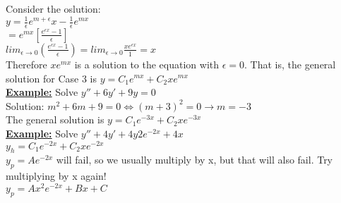 \documentclass[12pt]{article}
\newcommand{\myt}[1]{\textbf{\underline{#1}}}
\begin{document}
	Consider the oslution:\\
	$y = \frac{1}{\epsilon}e^{m+\epsilon}x - \frac{1}{\epsilon}e^{mx}$\\
	$= e^{mx}[\frac{e^{\epsilon x} - 1}{\epsilon}]$\\
	$lim_{\epsilon \rightarrow 0}(\frac{e^{\epsilon x} - 1}{\epsilon}) = lim_{\epsilon \rightarrow 0}\frac{xe^{\epsilon x}}{1} = x$\\
	
	Therefore $xe^{mx}$ is a solution to the equation with $\epsilon = 0$. That is, the general solution for Case 3 is $y = C_1e^{mx} + C_2xe^{mx}$\\
	
	\myt{Example:} Solve $y'' + 6y' + 9y = 0$\\
	Solution: $m^2 + 6m + 9 = 0 \iff (m+3)^2 = 0 \rightarrow m = -3$\\
	
	The general solution is $y = C_1e^{-3x} + C_2xe^{-3x}$\\
	
	\myt{Example:} Solve $y'' + 4y' + 4y 2e^{-2x} + 4x$\\
	$y_h = C_1e^{-2x} + C_2xe^{-2x}$\\
	$y_p = Ae^{-2x}$ will fail, so we usually multiply by x, but that will also fail. Try multiplying by x again!\\
	$y_p = Ax^2e^{-2x} + Bx + C$\\	
	
\end{document}
